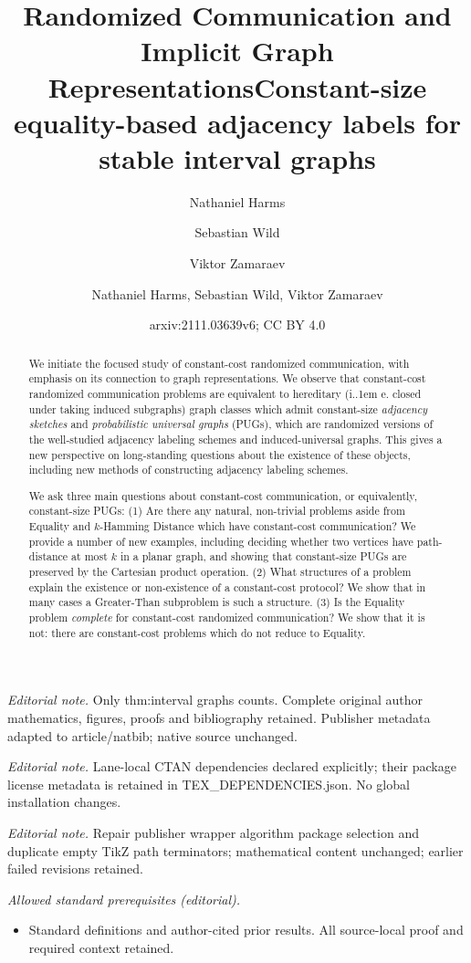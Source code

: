 \documentclass{article}
\title{Randomized Communication and Implicit Graph Representations}
\author{Nathaniel Harms \and Sebastian Wild \and Viktor Zamaraev}\date{}
\title{Constant-size equality-based adjacency labels for stable interval graphs}
\author{Nathaniel Harms, Sebastian Wild, Viktor Zamaraev}
\date{arxiv:2111.03639v6; CC BY 4.0}
\makeatletter
\newcommand*\ie{i.\kern.1em e.\@\xspace} %
\makeatother
\begin{document}
\maketitle
\noindent\textit{Editorial note.} Only thm:interval graphs counts. Complete original author mathematics, figures, proofs and bibliography retained. Publisher metadata adapted to article/natbib; native source unchanged.\par\medskip
\noindent\textit{Editorial note.} Lane-local CTAN dependencies declared explicitly; their package license metadata is retained in TEX\_DEPENDENCIES.json. No global installation changes.\par\medskip
\noindent\textit{Editorial note.} Repair publisher wrapper algorithm package selection and duplicate empty TikZ path terminators; mathematical content unchanged; earlier failed revisions retained.\par\medskip
\noindent\textit{Allowed standard prerequisites (editorial).}\begin{itemize}
\item Standard definitions and author-cited prior results. All source-local proof and required context retained.
\end{itemize}\medskip

\maketitle

\begin{abstract}
We initiate the focused study of constant-cost randomized communication, with emphasis on its
connection to graph representations. We observe that constant-cost randomized communication
problems are equivalent to hereditary (\ie closed under taking induced subgraphs) graph classes
which admit constant-size \emph{adjacency sketches} and \emph{probabilistic universal graphs}
(PUGs), which are randomized versions of the well-studied adjacency labeling schemes and
induced-universal graphs.  This gives a new perspective on long-standing questions about the
existence of these objects, including new methods of constructing adjacency labeling schemes.

We ask three main questions about constant-cost communication, or equivalently, constant-size
PUGs: (1) Are there any natural, non-trivial problems aside from Equality
and $k$-Hamming Distance which have constant-cost communication? We provide a number of new
examples, including deciding whether two vertices have path-distance at most $k$ in a planar graph,
and showing that constant-size PUGs are preserved by the Cartesian product operation.  (2) What
structures of a problem explain the existence or non-existence of a constant-cost protocol?  
We show that in many cases a Greater-Than subproblem is such a structure.
(3) Is the Equality problem \emph{complete} for constant-cost randomized communication? We
show that it is not: there are constant-cost problems which do not reduce to Equality.
\end{abstract}
\end{document}
